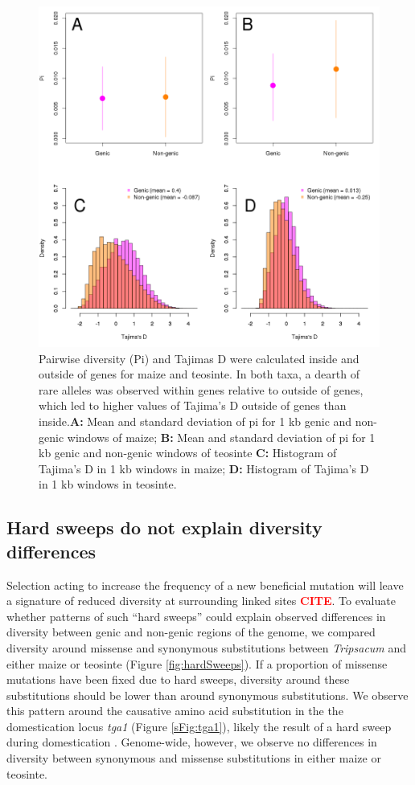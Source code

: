 \documentclass{pnastwo}
\newcommand{\citex}{\textcolor{red}{\bf CITE}}
\begin{document}
\begin{article}
\begin{figure}
\centering
\includegraphics[width=.5\textwidth]{FigsAndFiles/Pi_and_Tajima.png}
\caption{Pairwise diversity (Pi) and Tajimas D were calculated inside and outside of genes for maize and teosinte. In both taxa, a dearth of rare alleles was observed within genes relative to outside of genes, which led to higher values of Tajima's D outside of genes than inside.{\bf A:} Mean and standard deviation of pi for 1 kb genic and non-genic windows of maize; {\bf B:} Mean and standard deviation of pi for 1 kb genic and non-genic windows of teosinte  {\bf C:} Histogram of Tajima's D in 1 kb windows in maize; {\bf D:} Histogram of Tajima's D in 1 kb windows in teosinte.  \label{fig:diversity} }
\end{figure}

\subsection{Hard sweeps do not explain diversity differences}
Selection acting to increase the frequency of a new beneficial mutation will leave a signature of reduced diversity at surrounding linked sites \citex.
To evaluate whether patterns of such ``hard sweeps'' could explain observed differences in diversity between genic and non-genic regions of the genome, we compared diversity around missense and synonymous substitutions between \emph{Tripsacum} and either maize or teosinte (Figure
\ref{fig:hardSweeps}).
If a proportion of missense mutations have been fixed due to hard sweeps, diversity around these substitutions should be lower than around synonymous substitutions. 
We observe this pattern around the causative amino acid substitution in the the domestication locus \emph{tga1} (Figure \ref{sFig:tga1}), likely the result of a hard sweep during domestication \cite{wang2005origin, wang2015}.
Genome-wide, however, we observe no differences in diversity between synonymous and missense substitutions in either maize or teosinte.


\end{article}
\end{document}
